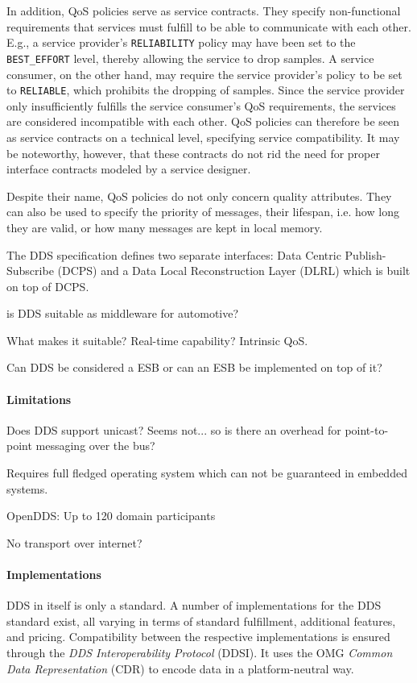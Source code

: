 In addition, QoS policies serve as service contracts. They specify non-functional requirements that services must fulfill to be able to communicate with each other. E.g., a service provider's \texttt{RELIABILITY} policy may have been set to the \texttt{BEST\_EFFORT} level, thereby allowing the service to drop samples. A service consumer, on the other hand, may require the service provider's policy to be set to \texttt{RELIABLE}, which prohibits the dropping of samples. Since the service provider only insufficiently fulfills the service consumer's QoS requirements, the services are considered incompatible with each other. QoS policies can therefore be seen as service contracts on a technical level, specifying service compatibility. It may be noteworthy, however, that these contracts do not rid the need for proper interface contracts modeled by a service designer.

Despite their name, QoS policies do not only concern quality attributes. They can also be used to specify the priority of messages, their lifespan, i.e. how long they are valid, or how many messages are kept in local memory.

The DDS specification defines two separate interfaces: Data Centric Publish-Subscribe (DCPS) and a Data Local Reconstruction Layer (DLRL) which is built on top of DCPS.

is DDS suitable as middleware for automotive?

What makes it suitable?
Real-time capability?
Intrinsic QoS.

Can DDS be considered a ESB or can an ESB be implemented on top of it?

\paragraph{Limitations}
Does DDS support unicast?
Seems not... so is there an overhead for point-to-point messaging over the bus?

Requires full fledged operating system which can not be guaranteed in embedded systems.

OpenDDS: Up to 120 domain participants

No transport over internet?


\paragraph{Implementations}
DDS in itself is only a standard. A number of implementations for the DDS standard exist, all varying in terms of standard fulfillment, additional features, and pricing. Compatibility between the respective implementations is ensured through the \emph{DDS Interoperability Protocol} (DDSI). It uses the OMG \emph{Common Data Representation} (CDR) to encode data in a platform-neutral way.

